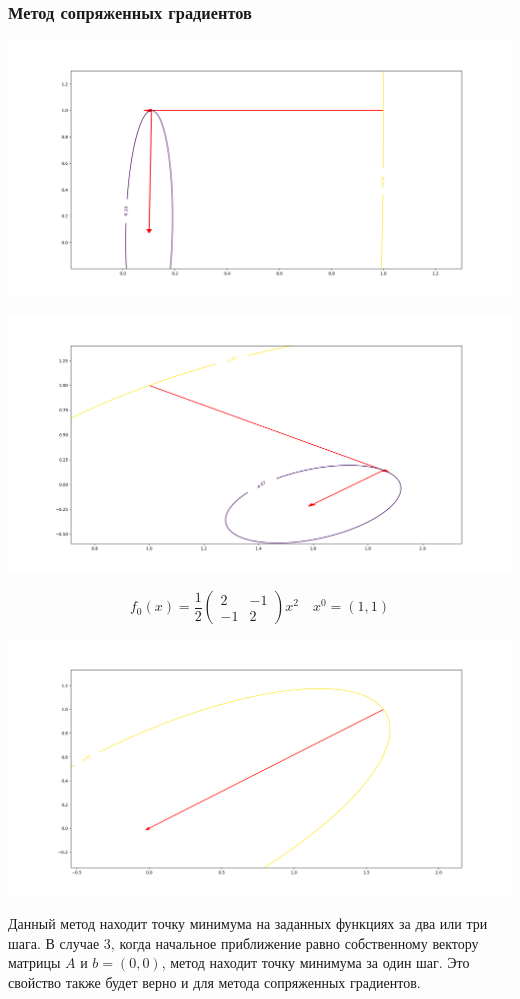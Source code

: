 \documentclass[english]{article}
\begin{document}
\subsubsection{Метод сопряженных градиентов}
\begin{center}
    \includegraphics[scale=0.3]{plots/traectories/conjugate_gradient_1.png}
\end{center}
\begin{center}
    \includegraphics[scale=0.3]{plots/traectories/conjugate_gradient_2.png}
\end{center}
\[ f_0(x) = \frac{1}{2}\begin{pmatrix}2 & -1 \\ -1 & 2\end{pmatrix}x^2 \quad x^0 = (1, 1) \]
\begin{center}
    \includegraphics[scale=0.3]{plots/traectories/conjugate_gradient_3.png}
\end{center}

Данный метод находит точку минимума на заданных функциях за два или три шага. В случае 3, когда начальное приближение равно собственному вектору матрицы \(A\) и \(b = (0, 0)\), метод находит точку минимума за один шаг. Это свойство также будет верно и для метода сопряженных градиентов. 
\end{document}
